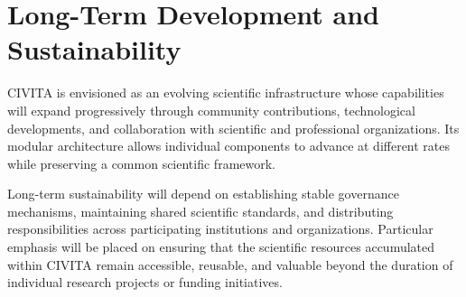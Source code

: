 \section{Long-Term Development and Sustainability}

CIVITA is envisioned as an evolving scientific infrastructure whose capabilities will expand progressively through community contributions, technological developments, and collaboration with scientific and professional organizations. Its modular architecture allows individual components to advance at different rates while preserving a common scientific framework.

Long-term sustainability will depend on establishing stable governance mechanisms, maintaining shared scientific standards, and distributing responsibilities across participating institutions and organizations. Particular emphasis will be placed on ensuring that the scientific resources accumulated within CIVITA remain accessible, reusable, and valuable beyond the duration of individual research projects or funding initiatives.

